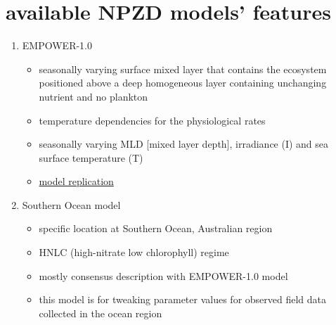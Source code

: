 \documentclass[a4paper,11pt]{article}
\begin{document}
    \section{available NPZD models' features}
    \begin{enumerate}
        \item EMPOWER-1.0\autocite{anderson2015empower}
        \begin{itemize}
            \item seasonally varying surface mixed layer that contains the ecosystem positioned above a deep homogeneous layer containing unchanging nutrient and no plankton
            \item temperature dependencies for the physiological rates
            \item seasonally varying MLD [mixed layer depth], irradiance (I) and sea surface temperature (T)
            \item \href{https://nbviewer.jupyter.org/github/ph-u/Project/blob/master/sandbox/m_NPZD_anderson2015empower.ipynb}{model replication}
        \end{itemize}
        \item Southern Ocean model\autocite{kidston2013phytoplankton}
        \begin{itemize}
            \item specific location at Southern Ocean, Australian region
            \item HNLC (high-nitrate low chlorophyll) regime
            \item mostly consensus description with EMPOWER-1.0 model
            \item this model is for tweaking parameter values for observed field data collected in the ocean region
        \end{itemize}
    \end{enumerate}
    
    \nocite{*}\printbibliography
\end{document}
